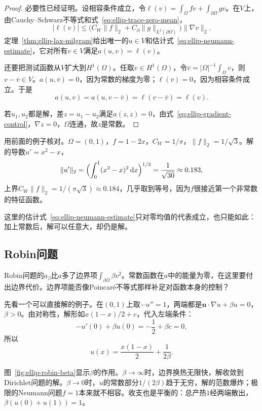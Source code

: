 \begin{proof}
必要性已经证明。设相容条件成立，令$\ell(v)=\int_\Omega fv+\int_{\partial\Omega}gv$。在$V$上，由Cauchy--Schwarz不等式和式~\eqref{eq:ellip-trace-zero-mean}，
\[
 \lvert\ell(v)\rvert\leq\bigl(C_W\lVert f\rVert_2+C_\partial\lVert g\rVert_{L^2(\partial\Omega)}\bigr)\lVert\nabla v\rVert_2 .
\]
定理~\ref{thm:ellip-lax-milgram}给出唯一的$u\in V$和估计式~\eqref{eq:ellip-neumann-estimate}，它对所有$v\in V$满足$a(u,v)=\ell(v)$。

还要把测试函数从$V$扩大到$H^1(\Omega)$。任取$v\in H^1(\Omega)$，令$\bar v=\lvert\Omega\rvert^{-1}\int_\Omega v$，则$v-\bar v\in V$。$a(u,\bar v)=0$，因为常数的梯度为零；$\ell(\bar v)=0$，因为相容条件成立。于是
\[
 a(u,v)=a(u,v-\bar v)=\ell(v-\bar v)=\ell(v) .
\]

若$u_1,u_2$都是解，差$z=u_1-u_2$满足$a(z,z)=0$，由式~\eqref{eq:ellip-gradient-control}，$\nabla z=0$，$\Omega$连通，故$z$是常数。
\end{proof}

用前面的例子核对。$\Omega=(0,1)$，$f=1-2x$，$C_W=1/\pi$，$\lVert f\rVert_2=1/\sqrt3$。解的导数$u'=x^2-x$，
\[
 \lVert u'\rVert_2=\Bigl(\int_0^1(x^2-x)^2\,\mathrm{d}x\Bigr)^{1/2}=\frac1{\sqrt{30}}\approx0.183,
\]
上界$C_W\lVert f\rVert_2=1/(\pi\sqrt3)\approx0.184$，几乎取到等号，因为$f$很接近第一个非常数的特征函数。

这里的估计式~\eqref{eq:ellip-neumann-estimate}只对零均值的代表成立，也只能如此：加上常数后，解可以任意大，却仍是解。

\subsection{Robin问题}
\label{sec:ellip-robin}

Robin问题的$a_\beta$比$a$多了边界项$\int_{\partial\Omega}\beta v^2$。常数函数在$a$中的能量为零，在这里要付出边界代价。边界项能否像Poincaré不等式那样补足对函数本身的控制？

先看一个可以直接解的例子。在$(0,1)$上取$-u''=1$，两端都是$\bm{n}\cdot\nabla u+\beta u=0$，$\beta>0$。由对称性，解形如$x(1-x)/2+c$，代入左端条件：
\[
 -u'(0)+\beta u(0)=-\frac12+\beta c=0 ,
\]
所以
\begin{equation}
 u(x)=\frac{x(1-x)}2+\frac1{2\beta}.
 \label{eq:ellip-robin-example}
\end{equation}

图~\ref{fig:ellip-robin-beta}显示$\beta$的作用。$\beta\to\infty$时，边界换热无限快，解收敛到Dirichlet问题的解。$\beta\to0$时，$u$的常数部分$1/(2\beta)$趋于无穷，解的范数爆炸；极限的Neumann问题$f=1$本来就不相容。收支也是平衡的：总产热$1$经两端散出，$\beta(u(0)+u(1))=1$。

